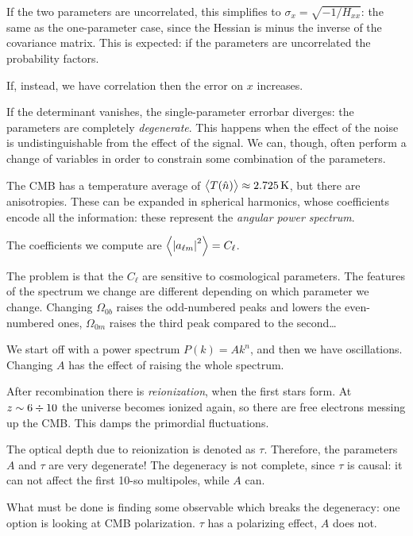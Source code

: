 \documentclass[main.tex]{subfiles}
\begin{document}
If the two parameters are uncorrelated, this simplifies to \(\sigma _x = \sqrt{- 1 / H_{xx}}\): the same as the one-parameter case, since the Hessian is minus the inverse of the covariance matrix.
This is expected: if the parameters are uncorrelated the probability factors.

If, instead, we have correlation then the error on \(x\) increases.

If the determinant vanishes, the single-parameter errorbar diverges: the parameters are completely \emph{degenerate}. 
This happens when the effect of the noise is undistinguishable from the effect of the signal. 
We can, though, often perform a change of variables in order to constrain some combination of the parameters. 

The CMB has a temperature average of \(\expval{T(\hat{n})} \approx \SI{2.725}{K}\), but there are anisotropies. 
These can be expanded in spherical harmonics, whose coefficients encode all the information: these represent the \emph{angular power spectrum}.

The coefficients we compute are \(\expval{\abs{a_{\ell m}}^2} = C_\ell\). 

The problem is that the \(C_\ell\) are sensitive to cosmological parameters. The features of the spectrum we change are different depending on which parameter we change. 
Changing \(\Omega _{0b}\) raises the odd-numbered peaks and lowers the even-numbered ones, \(\Omega _{0m}\) raises the third peak compared to the second\dots 

We start off with a power spectrum \(P(k) = A k^{n}\), and then we have oscillations. Changing \(A\) has the effect of raising the whole spectrum. 

After recombination there is \emph{reionization}, when the first stars form. At \(z \sim 6 \divisionsymbol 10\) the universe becomes ionized again, so there are free electrons messing up the CMB. This damps the primordial fluctuations. 

The optical depth due to reionization is denoted as \(\tau \). 
Therefore, the parameters \(A\) and \(\tau \) are very degenerate!
The degeneracy is not complete, since \(\tau \) is causal: it can not affect the first 10-so multipoles, while \(A\) can.

What must be done is finding some observable which breaks the degeneracy: one option is looking at CMB polarization.
\(\tau \) has a polarizing effect, \(A\) does not. 
\end{document}
